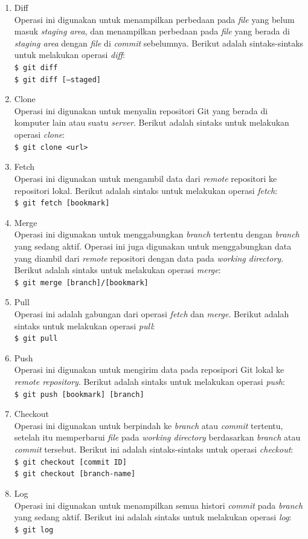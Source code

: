 \begin{enumerate}
\item Diff\\
Operasi ini digunakan untuk menampilkan perbedaan pada \textit{file} yang belum masuk \textit{staging area}, dan menampilkan perbedaan pada \textit{file} yang berada di \textit{staging area} dengan \textit{file} di \textit{commit} sebelumnya.  Berikut adalah sintaks-sintaks untuk melakukan operasi \textit{diff}:\\
\texttt{\$ git diff} \\
\texttt{\$ git diff [--staged]}\\
\item Clone\\
Operasi ini digunakan untuk menyalin repositori Git yang berada di komputer lain atau suatu \textit{server}. Berikut adalah sintaks untuk melakukan operasi \textit{clone}:\\
\texttt{\$ git clone <url>}
\item Fetch\\
Operasi ini digunakan untuk mengambil data dari \textit{remote} repositori ke repositori lokal. Berikut adalah sintaks untuk melakukan operasi \textit{fetch}:\\
\texttt{\$ git fetch [bookmark]}
\item Merge\\
Operasi ini digunakan untuk menggabungkan \textit{branch} tertentu dengan \textit{branch} yang sedang aktif. Operasi ini juga digunakan untuk menggabungkan data yang diambil dari \textit{remote} repositori dengan data pada \textit{working directory}. Berikut adalah sintaks untuk melakukan operasi \textit{merge}:\\
\texttt{\$ git merge [branch]/[bookmark]}
\item Pull\\
Operasi ini adalah gabungan dari operasi \textit{fetch} dan \textit{merge}. Berikut adalah sintaks untuk melakukan operasi \textit{pull}:\\
\texttt{\$ git pull }
\item Push\\
Operasi ini digunakan untuk mengirim data pada reposipori Git lokal ke \textit{remote repository}.
Berikut adalah sintaks untuk melakukan operasi \textit{push}:\\
\texttt{\$ git push [bookmark] [branch]}
\item Checkout\\
Operasi ini digunakan untuk berpindah ke \textit{branch} atau \textit{commit} tertentu, setelah itu memperbarui \textit{file} pada \textit{working directory} berdasarkan \textit{branch} atau \textit{commit} tersebut. Berikut ini adalah sintaks-sintaks untuk operasi \textit{checkout}:\\
\texttt{\$ git checkout [commit ID]}\\
\texttt{\$ git checkout [branch-name]}
\item Log\\
Operasi ini digunakan untuk menampilkan semua histori \textit{commit} pada \textit{branch} yang sedang aktif. Berikut ini adalah sintaks untuk melakukan operasi \textit{log}:\\
\texttt{\$ git log}


\end{enumerate}
